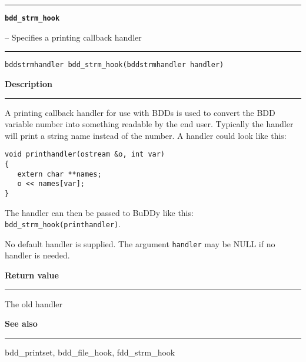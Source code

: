 \begin{minipage}{\textwidth}

\noindent\begin{minipage}{\textwidth}
\rule{\textwidth}{0.5mm}
{\tt\bf bdd\_strm\_hook }
\--- Specifies a printing callback handler  \hspace{\fill}
\\\rule[1.5ex]{\textwidth}{0.5mm}
\end{minipage}

\noindent\begin{verbatim}
bddstrmhandler bdd_strm_hook(bddstrmhandler handler) 
\end{verbatim}

\vspace{\parsep}\noindent
{\bf Description}\\\rule[1.5ex]{\textwidth}{0.2mm}\vspace{-1.5ex}\setlength{\parindent}{1em}
A printing callback handler for use with BDDs is used to
           convert the BDD variable number into something readable by the
	   end user. Typically the handler will print a string name
	   instead of the number. A handler could look like this:
	   \begin{verbatim}
void printhandler(ostream &o, int var)
{
   extern char **names;
   o << names[var];
}
\end{verbatim}

           \noindent
           The handler can then be passed to BuDDy like this:
	   {\tt bdd\_strm\_hook(printhandler)}.

	   No default handler is supplied. The argument {\tt handler} may be
	   NULL if no handler is needed. 

\setlength{\parindent}{0em}\vspace{\parsep}\vspace{\baselineskip}\noindent
{\bf Return value}\\\rule[1.5ex]{\textwidth}{0.2mm}\vspace{-1.5ex}
The old handler 

\vspace{\parsep}\vspace{\baselineskip}\noindent
{\bf See also}\\\rule[1.5ex]{\textwidth}{0.2mm}\vspace{-1.5ex}
bdd\_printset, bdd\_file\_hook, fdd\_strm\_hook 
\end{minipage}
